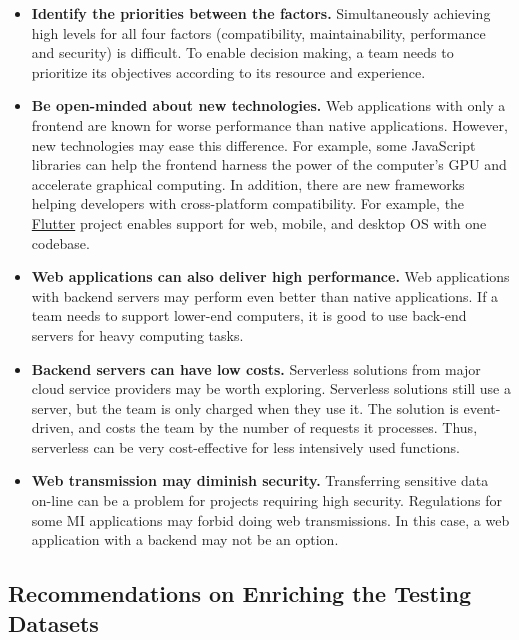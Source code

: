 \documentclass[final, 3p, times, authoryear]{elsarticle}
\begin{document}
\begin{itemize}
\item \textbf{Identify the priorities between the factors.} Simultaneously
achieving high levels for all four factors (compatibility, maintainability,
performance and security) is difficult. To enable decision making, a team needs
to prioritize its objectives according to its resource and experience.

\item \textbf{Be open-minded about new technologies.} Web applications with only
a frontend are known for worse performance than native applications. However,
new technologies may ease this difference. For example, some JavaScript
libraries can help the frontend harness the power of the computer's GPU and
accelerate graphical computing. In addition, there are new frameworks helping
developers with cross-platform compatibility. For example, the
\href{https://flutter.dev/}{Flutter} project enables support for web, mobile,
and desktop OS with one codebase.

\item \textbf{Web applications can also deliver high performance.} Web
applications with backend servers may perform even better than native
applications. If a team needs to support lower-end computers, it is good to use
back-end servers for heavy computing tasks.

\item \textbf{Backend servers can have low costs.} Serverless solutions from
major cloud service providers may be worth exploring. Serverless solutions still
use a server, but the team is only charged when they use it. The solution is
event-driven, and costs the team by the number of requests it processes. Thus,
serverless can be very cost-effective for less intensively used functions.

\item \textbf{Web transmission may diminish security.} Transferring sensitive
data on-line can be a problem for projects requiring high security. Regulations
for some MI applications may forbid doing web transmissions. In this case, a web
application with a backend may not be an option.

\end{itemize}

\subsection{Recommendations on Enriching the Testing Datasets} 
\label{sec_recommendations_testing_dataset}
\end{document}
